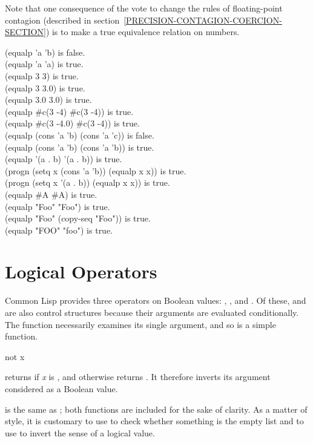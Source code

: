 \begin{defun}[Function]
\begin{new}
Note that one consequence
of the vote to change the rules of
floating-point contagion
(described in section~\ref{PRECISION-CONTAGION-COERCION-SECTION})
is to make 
a true equivalence relation on numbers.
\end{new}

\begin{lisp}
(equalp 'a 'b) {\rm is false.} \\
(equalp 'a 'a) {\rm is true.} \\
(equalp 3 3) {\rm is true.} \\
(equalp 3 3.0) {\rm is true.} \\
(equalp 3.0 3.0) {\rm is true.} \\
(equalp \#c(3 -4) \#c(3 -4)) {\rm is true.} \\
(equalp \#c(3 -4.0) \#c(3 -4)) {\rm is true.} \\
(equalp (cons 'a 'b) (cons 'a 'c)) {\rm is false.} \\
(equalp (cons 'a 'b) (cons 'a 'b)) {\rm is true.} \\
(equalp '(a . b) '(a . b)) {\rm is true.} \\
(progn (setq x (cons 'a 'b)) (equalp x x)) {\rm is true.} \\
(progn (setq x '(a . b)) (equalp x x)) {\rm is true.} \\
(equalp \#{\Xbackslash}A \#{\Xbackslash}A) {\rm is true.} \\
(equalp "Foo" "Foo") {\rm is true.} \\
(equalp "Foo" (copy-seq "Foo")) {\rm is true.} \\
(equalp "FOO" "foo") {\rm is true.}
\end{lisp}
\end{defun}

\section{Logical Operators}

Common Lisp provides three operators on Boolean values: , ,
and .  Of these,  and 
are also control structures because their arguments are evaluated
conditionally.
The function  necessarily examines its single argument, and so
is a simple function.

\begin{defun}[Function]
not x

 returns {\true} if {\it x} is {\false}, and otherwise returns {\false}.
It therefore inverts its argument considered as a Boolean value.

 is the same as ; both functions are included for the sake
of clarity.  As a matter of style,
it is customary to use  to check whether something is the empty list
and to use  to invert the sense of a logical value.
\end{defun}

